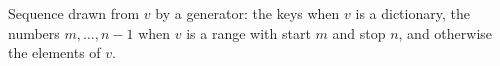 Sequence drawn from $v$ by a generator: the keys when $v$ is a dictionary, the numbers $m, \ldots, n - 1$ when $v$ is a range with start $m$ and stop $n$, and otherwise the elements of $v$.

